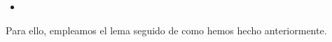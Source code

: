 \begin{isabellebody}
\begin{isamarkuptext}
  \begin{itemize}
    \item[]  
        \hspace{3cm} 
  \end{itemize}

  Para ello, empleamos el lema  seguido de 
  como hemos hecho anteriormente.


\end{isamarkuptext}
\end{isabellebody}
